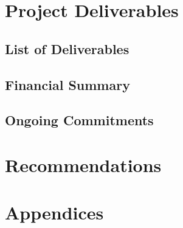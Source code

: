 \documentclass[twocolumn, amsmath, amssymb, aps, pra, 12pt, floatfix, showpacs]{revtex4-1}
\begin{document}
\section{\label{sec:projectdeliverables}Project Deliverables}


\subsection{\label{sec:projectdeliverables:listofdeliverables}List of Deliverables}


\subsection{\label{sec:projectdeliverables:financialsummary}Financial Summary}


\subsection{\label{sec:projectdeliverables:ongoingcommitments}Ongoing Commitments}



\section{\label{sec:recommendations}Recommendations}


\section{\label{sec:appendices}Appendices}



\end{document}
